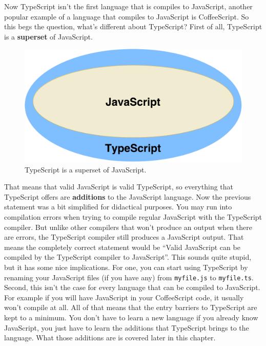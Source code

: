 \documentclass[12pt,a4paper]{report}
\begin{document}
Now TypeScript isn't the first language that is compiles to JavaScript, another popular example of a language that compiles to JavaScript is CoffeeScript. So this begs the question, what's different about TypeScript? First of all, TypeScript is a \textbf{superset} of JavaScript.
\begin{figure}
\centering
\includegraphics[scale=0.5]{figures/ts-js-diagram.pdf}
\caption{TypeScript is a superset of JavaScript.}
\end{figure}
That means that valid JavaScript is valid TypeScript, so everything that TypeScript offers are \textbf{additions} to the JavaScript language. Now the previous statement was a bit simplified for didactical purposes. You may run into compilation errors when trying to compile regular JavaScript with the TypeScript compiler. But unlike other compilers that won't produce an output when there are errors, the TypeScript compiler still produces a JavaScript output. That means the completely correct statement would be ``Valid JavaScript can be compiled by the TypeScript compiler to JavaScript''. This sounds quite stupid, but it has some nice implications. For one, you can start using TypeScript by renaming your JavaScript files (if you have any) from \texttt{myfile.js} to \texttt{myfile.ts}. Second, this isn't the case for every language that can be compiled to JavaScript. For example if you will have JavaScript in your CoffeeScript code, it usually won't compile at all. All of that means that the entry barriers to TypeScript are kept to a minimum. You don't have to learn a new language if you already know JavaScript, you just have to learn the additions that TypeScript brings to the language. What those additions are  is covered later in this chapter.
\end{document}
